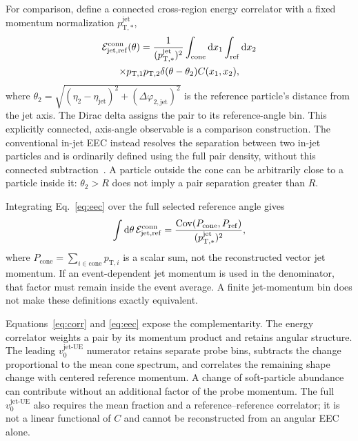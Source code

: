 \documentclass[aps,prc,twocolumn,superscriptaddress,nofootinbib,longbibliography,floatfix,10pt]{revtex4-2}
\newcommand{\vjet}{{v_0^{\mathrm{jet\text{-}UE}}}}
\newcommand{\Cov}{\operatorname{Cov}}
\newcommand{\dd}{\mathrm d}
\begin{document}
For comparison, define a connected cross-region energy correlator with a fixed momentum normalization $p_{\mathrm T,*}^{\mathrm{jet}}$,
\begin{multline}
 {\cal E}^{\mathrm{conn}}_{\mathrm{jet,ref}}(\theta)
 =\frac{1}{(p_{\mathrm T,*}^{\mathrm{jet}})^2}
 \int_{\mathrm{cone}}\dd x_1\int_{\mathrm{ref}}\dd x_2\\
 \times p_{\mathrm T,1}p_{\mathrm T,2}
 \delta(\theta-\theta_2)C(x_1,x_2),
 \label{eq:eec}
\end{multline}
where $\theta_2=\sqrt{(\eta_2-\eta_{\mathrm{jet}})^2+(\Delta\varphi_{2,\mathrm{jet}})^2}$ is the reference particle's distance from the jet axis. The Dirac delta assigns the pair to its reference-angle bin. This explicitly connected, axis-angle observable is a comparison construction. The conventional in-jet EEC instead resolves the separation between two in-jet particles and is ordinarily defined using the full pair density, without this connected subtraction~\cite{Basham,Andres}. A particle outside the cone can be arbitrarily close to a particle inside it: $\theta_2>R$ does not imply a pair separation greater than $R$.

Integrating Eq.~\eqref{eq:eec} over the full selected reference angle gives
\begin{equation}
 \int\dd\theta\,{\cal E}^{\mathrm{conn}}_{\mathrm{jet,ref}}
 =\frac{\Cov(P_{\mathrm{cone}},P_{\mathrm{ref}})}{(p_{\mathrm T,*}^{\mathrm{jet}})^2},
 \label{eq:inteec}
\end{equation}
where $P_{\mathrm{cone}}=\sum_{i\in\mathrm{cone}}p_{\mathrm T,i}$ is a scalar sum, not the reconstructed vector jet momentum. If an event-dependent jet momentum is used in the denominator, that factor must remain inside the event average. A finite jet-momentum bin does not make these definitions exactly equivalent.

Equations~\eqref{eq:corr} and \eqref{eq:eec} expose the complementarity. The energy correlator weights a pair by its momentum product and retains angular structure. The leading $\vjet$ numerator retains separate probe bins, subtracts the change proportional to the mean cone spectrum, and correlates the remaining shape change with centered reference momentum. A change of soft-particle abundance can contribute without an additional factor of the probe momentum. The full $\vjet$ also requires the mean fraction and a reference--reference correlator; it is not a linear functional of $C$ and cannot be reconstructed from an angular EEC alone.
\end{document}
